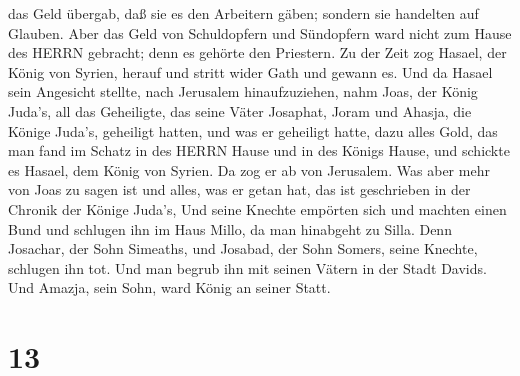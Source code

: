 das Geld übergab, daß sie es den Arbeitern gäben; sondern sie handelten
auf Glauben.  Aber das Geld von Schuldopfern und Sündopfern
ward nicht zum Hause des HERRN gebracht; denn es gehörte den Priestern.
 Zu der Zeit zog Hasael, der König von Syrien, herauf und
stritt wider Gath und gewann es. Und da Hasael sein Angesicht stellte,
nach Jerusalem hinaufzuziehen,  nahm Joas, der König
Juda's, all das Geheiligte, das seine Väter Josaphat, Joram und Ahasja,
die Könige Juda's, geheiligt hatten, und was er geheiligt hatte, dazu
alles Gold, das man fand im Schatz in des HERRN Hause und in des Königs
Hause, und schickte es Hasael, dem König von Syrien. Da zog er ab von
Jerusalem.  Was aber mehr von Joas zu sagen ist und alles,
was er getan hat, das ist geschrieben in der Chronik der Könige Juda's,
 Und seine Knechte empörten sich und machten einen Bund und
schlugen ihn im Haus Millo, da man hinabgeht zu Silla. 
Denn Josachar, der Sohn Simeaths, und Josabad, der Sohn Somers, seine
Knechte, schlugen ihn tot. Und man begrub ihn mit seinen Vätern in der
Stadt Davids. Und Amazja, sein Sohn, ward König an seiner Statt.

\hypertarget{section-12}{%
\section{13}\label{section-12}}

